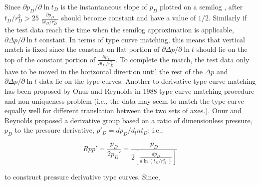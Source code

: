 \documentclass{llncs}
\numberwithin{equation}{section}
\numberwithin{figure}{section}
\numberwithin{table}{section}
\begin{document}
     Since ${\partial {{p}_{D}}}/{\partial \ln {{t}_{D}}}$ is the instantaneous slope of $p_{D}$ plotted on a semilog , after $t_{D}/r_{D}^{2}>25$ $\frac{\partial {{p}_{D}}}{\partial {{{t}_{D}}}/{r_{D}^{2}}\;}$ should become constant and have a value of $1/2$. Similarly if the test data reach the time when the semilog approximation is applicable, ${\partial \Delta p}/{\partial \ln {{t}}}$  constant. In terms of type curve matching, this means that vertical match is fixed since the constant on flat portion of ${\partial \Delta p}/{\partial \ln {{t}}}$ should lie on the top of the constant portion of $\frac{\partial {{p}_{D}}}{\partial {{{t}_{D}}}/{r_{D}^{2}}\;}$. To complete the match, the test data only have to be moved in the horizontal direction until the rest of the $\Delta p$ and ${\partial \Delta p}/{\partial \ln {{t}}}$ data lie on the type curves.
    Another  to derivative type curve matching has been proposed by Onur and Reynolds in 1988 \cite{Onur_1988_1} type curve matching procedure and  non-uniqueness problem (i.e., the data may seem to match the type curve equally well for different translation between the two sets of axes.).
    Onur and Reynolds proposed a derivative group based on a ratio of dimensionless pressure, $p_{D}$ to the pressure derivative, $p'_{D} = dp_{D}/d_lnt_{D}$; i.e.,

    \begin{equation}
        Rpp'=\frac{{{p}_{D}}}{2{{p}_{D}}'}=\frac{{{p}_{D}}}{2\left[ \frac{d{{p}_{D}}}{d\ln \left( {{{t}_{D}}}/{r_{D}^{2}}\; \right)} \right]}
        \label{Rpp_prime}
    \end{equation}

    to construct pressure derivative type curves. Since,
\end{document}
